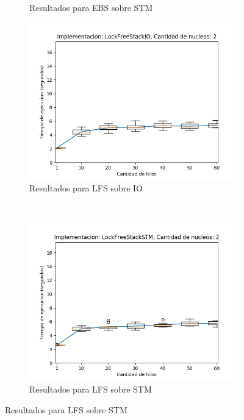 \begin{figure}[!h]
\begin{subfigure}[b]{0.49\textwidth}
        \caption{Resultados para EBS sobre STM}
        \label{subfig:numberOfThreadsDist-ebsstm-2}
    \end{subfigure}
    \begin{subfigure}[b]{0.49\textwidth}
        \includegraphics[width=\textwidth]{images/numberOfThreadsDist/plots/expLFSIO-2}
        \caption{Resultados para LFS sobre IO}
        \label{subfig:numberOfThreadsDist-lfsio-2}
    \end{subfigure}
    ~
    \begin{subfigure}[b]{0.49\textwidth}
        \includegraphics[width=\textwidth]{images/numberOfThreadsDist/plots/expLFSSTM-2}
        \caption{Resultados para LFS sobre STM}
        \label{subfig:numberOfThreadsDist-lfsstm-2}

\end{subfigure}
\end{figure}
